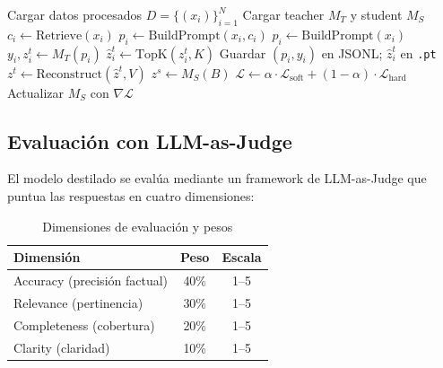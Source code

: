 \documentclass[conference]{IEEEtran}
\begin{document}
\begin{algorithm}[t]
\caption{Pipeline de Destilaci\'on con RAG}
\label{alg:pipeline}
\begin{algorithmic}[1]
\State Cargar datos procesados $D = \{(x_i)\}_{i=1}^{N}$
\State Cargar teacher $M_T$ y student $M_S$
        \State $c_i \leftarrow \text{Retrieve}(x_i)$ 
        \State $p_i \leftarrow \text{BuildPrompt}(x_i, c_i)$
    \Else
        \State $p_i \leftarrow \text{BuildPrompt}(x_i)$
    \EndIf
    \State $y_i, z_i^t \leftarrow M_T(p_i)$ 
    \State $\hat{z}_i^t \leftarrow \text{TopK}(z_i^t, K)$ 
    \State Guardar $(p_i, y_i)$ en JSONL; $\hat{z}_i^t$ en \texttt{.pt}
\EndFor
{}
        \State $z^t \leftarrow \text{Reconstruct}(\hat{z}^t, V)$ 
        \State $z^s \leftarrow M_S(B)$ 
        \State $\mathcal{L} \leftarrow \alpha \cdot \mathcal{L}_{\text{soft}} + (1-\alpha) \cdot \mathcal{L}_{\text{hard}}$
        \State Actualizar $M_S$ con $\nabla \mathcal{L}$
    \EndFor
\EndFor
\end{algorithmic}
\end{algorithm}

\subsection{Evaluaci\'on con LLM-as-Judge}
\label{sec:evaluation}

El modelo destilado se eval\'ua mediante un framework de LLM-as-Judge que puntua las respuestas en cuatro dimensiones:

\begin{table}[h]
\centering
\caption{Dimensiones de evaluaci\'on y pesos}
\label{tab:eval_dimensions}
\begin{tabular}{lcc}
\toprule
\textbf{Dimensi\'on} & \textbf{Peso} & \textbf{Escala} \\
\midrule
Accuracy (precisi\'on factual) & 40\% & 1--5 \\
Relevance (pertinencia) & 30\% & 1--5 \\
Completeness (cobertura) & 20\% & 1--5 \\
Clarity (claridad) & 10\% & 1--5 \\
\bottomrule
\end{tabular}
\end{table}
\end{document}
